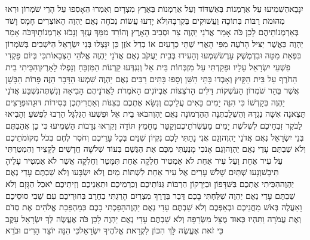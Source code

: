 \documentclass[../main/main.tex]{subfiles}
\begin{document}
\begin{multicols*}{\ncols}
יִנָּבֵא\PreVerseSpace{}הַשְׁמִיעוּ עַל אַרְמְנוֹת בְּאַשְׁדּוֹד וְעַל אַרְמְנוֹת בְּאֶרֶץ מִצְרָיִם וְאִמְרוּ הֵאָסְפוּ עַל הָרֵי שֹׁמְרוֹן וּרְאוּ מְהוּמֹת רַבּוֹת בְּתוֹכָהּ וַעֲשׁוּקִים בְּקִרְבָּהּ\PreVerseSpace{}וְלֹא יָדְעוּ עֲשׂוֹת נְכֹחָה נְאֻם יַהְוֶה הָאוֹצְרִים חָמָס וָשֹׁד בְּאַרְמְנוֹתֵיהֶם לָכֵן כֹּה אָמַר אֲדֹנַי יַהְוֶה צַר וּסְבִיב הָאָרֶץ וְהוֹרִד מִמֵּךְ עֻזֵּךְ וְנָבֹזּוּ אַרְמְנוֹתָיִךְ\PreVerseSpace{}כֹּה אָמַר יַהְוֶה כַּאֲשֶׁר יַצִּיל הָרֹעֶה מִפִּי הָאֲרִי שְׁתֵּי כְרָעַיִם אוֹ בְדַל אֹזֶן כֵּן יִנָּצְלוּ בְּנֵי יִשְׂרָאֵל הַיֹּשְׁבִים בְּשֹׁמְרוֹן בִּפְאַת מִטָּה וּבִדְמֶשֶׁק עָרֶשׂ\PreVerseSpace{}שִׁמְעוּ וְהָעִידוּ בְּבֵית יַעֲקֹב נְאֻם אֲדֹנַי יַהְוֶה אֱלֹהֵי הַצְּבָאוֹת\PreVerseSpace{}כִּי בְּיוֹם פָּקְדִי פִשְׁעֵי יִשְׂרָאֵל עָלָיו וּפָקַדְתִּי עַל מִזְבְּחוֹת בֵּית אֵל וְנִגְדְּעוּ קַרְנוֹת הַמִּזְבֵּחַ וְנָפְלוּ לָאָרֶץ\PreVerseSpace{}וְהִכֵּיתִי בֵית הַחֹרֶף עַל בֵּית הַקָּיִץ וְאָבְדוּ בָּתֵּי הַשֵּׁן וְסָפוּ בָּתִּים רַבִּים נְאֻם יַהְוֶה \ClosedSection{}שִׁמְעוּ הַדָּבָר הַזֶּה פָּרוֹת הַבָּשָׁן אֲשֶׁר בְּהַר שֹׁמְרוֹן הָעֹשְׁקוֹת דַּלִּים הָרֹצְצוֹת אֶבְיוֹנִים הָאֹמְרֹת לַאֲדֹנֵיהֶם הָבִיאָה וְנִשְׁתֶּה\PreVerseSpace{}נִשְׁבַּע אֲדֹנַי יַהְוֶה בְּקָדְשׁוֹ כִּי הִנֵּה יָמִים בָּאִים עֲלֵיכֶם וְנִשָּׂא אֶתְכֶם בְּצִנּוֹת וְאַחֲרִיתְכֶן בְּסִירוֹת דּוּגָה\PreVerseSpace{}וּפְרָצִים תֵּצֶאנָה אִשָּׁה נֶגְדָּהּ וְהֻשְׁלַכְתֶּנָה\SubEnd{} הַהַרְמוֹנָה נְאֻם יַהְוֶה\PreVerseSpace{}בֹּאוּ בֵית אֵל וּפִשְׁעוּ הַגִּלְגָּל הַרְבּוּ לִפְשֹׁעַ וְהָבִיאוּ לַבֹּקֶר זִבְחֵיכֶם לִשְׁלֹשֶׁת יָמִים מַעְשְׂרֹתֵיכֶם\PreVerseSpace{}וְקַטֵּר מֵחָמֵץ תּוֹדָה וְקִרְאוּ נְדָבוֹת הַשְׁמִיעוּ כִּי כֵן אֲהַבְתֶּם בְּנֵי יִשְׂרָאֵל נְאֻם אֲדֹנַי יַהְוֶה\PreVerseSpace{}וְגַם אֲנִי נָתַתִּי לָכֶם נִקְיוֹן שִׁנַּיִם בְּכָל עָרֵיכֶם וְחֹסֶר לֶחֶם בְּכֹל מְקוֹמֹתֵיכֶם וְלֹא שַׁבְתֶּם עָדַי נְאֻם יַהְוֶה\PreVerseSpace{}וְגַם אָנֹכִי מָנַעְתִּי מִכֶּם אֶת הַגֶּשֶׁם בְּעוֹד שְׁלֹשָׁה חֳדָשִׁים לַקָּצִיר וְהִמְטַרְתִּי עַל עִיר אֶחָת וְעַל עִיר אַחַת לֹא אַמְטִיר חֶלְקָה אַחַת תִּמָּטֵר וְחֶלְקָה אֲשֶׁר לֹא אַמְטִיר\SubEnd{} עָלֶיהָ תִּיבָשׁ\PreVerseSpace{}וְנָעוּ שְׁתַּיִם שָׁלֹשׁ עָרִים אֶל עִיר אַחַת לִשְׁתּוֹת מַיִם וְלֹא יִשְׂבָּעוּ וְלֹא שַׁבְתֶּם עָדַי נְאֻם יַהְוֶה\PreVerseSpace{}הִכֵּיתִי אֶתְכֶם בַּשִּׁדָּפוֹן וּבַיֵּרָקוֹן הַרְבּוֹת גַּנּוֹתֵיכֶם וְכַרְמֵיכֶם וּתְאֵנֵיכֶם וְזֵיתֵיכֶם יֹאכַל הַגָּזָם וְלֹא שַׁבְתֶּם עָדַי נְאֻם יַהְוֶה \ClosedSection{}שִׁלַּחְתִּי בָכֶם דֶּבֶר בְּדֶרֶךְ מִצְרַיִם הָרַגְתִּי בַחֶרֶב בַּחוּרֵיכֶם עִם שְׁבִי סוּסֵיכֶם וָאַעֲלֶה בְּאֹשׁ מַחֲנֵיכֶם וּבְאַפְּכֶם וְלֹא שַׁבְתֶּם עָדַי נְאֻם יַהְוֶה\PreVerseSpace{}הָפַכְתִּי בָכֶם כְּמַהְפֵּכַת אֱלֹהִים אֶת סְדֹם וְאֶת עֲמֹרָה וַתִּהְיוּ כְּאוּד מֻצָּל מִשְּׂרֵפָה וְלֹא שַׁבְתֶּם עָדַי נְאֻם יַהְוֶה \ClosedSection{}לָכֵן כֹּה אֶעֱשֶׂה לְּךָ יִשְׂרָאֵל עֵקֶב כִּי זֹאת אֶעֱשֶׂה לָּךְ הִכּוֹן לִקְרַאת אֱלֹהֶיךָ יִשְׂרָאֵל\PreVerseSpace{}כִּי הִנֵּה יוֹצֵר הָרִים וּבֹרֵא 
\end{multicols*}
\end{document}
